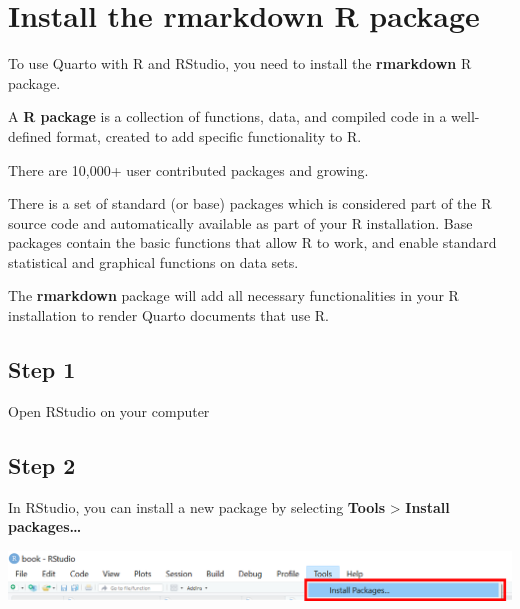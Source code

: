 \documentclass[
  letterpaper,
  DIV=11,
  numbers=noendperiod,
  oneside]{scrreprt}
\begin{document}
\hypertarget{sec-rmarkdown-installation}{%
\section{Install the rmarkdown R
package}\label{sec-rmarkdown-installation}}

To use Quarto with R and RStudio, you need to install the
\textbf{rmarkdown} R package.

\begin{tcolorbox}[enhanced jigsaw, coltitle=black, opacityback=0, title=\textcolor{quarto-callout-note-color}{\faInfo}\hspace{0.5em}{Note}, toprule=.15mm, bottomtitle=1mm, colbacktitle=quarto-callout-note-color!10!white, colframe=quarto-callout-note-color-frame, left=2mm, opacitybacktitle=0.6, bottomrule=.15mm, arc=.35mm, toptitle=1mm, colback=white, titlerule=0mm, breakable, leftrule=.75mm, rightrule=.15mm]

A \textbf{R package} is a collection of functions, data, and compiled
code in a well-defined format, created to add specific functionality to
R.

There are 10,000+ user contributed packages and growing.

There is a set of standard (or base) packages which is considered part
of the R source code and automatically available as part of your R
installation. Base packages contain the basic functions that allow R to
work, and enable standard statistical and graphical functions on data
sets.

\end{tcolorbox}

The \textbf{rmarkdown} package will add all necessary functionalities in
your R installation to render Quarto documents that use R.

\subsection{Step 1}

Open RStudio on your computer

\subsection{Step 2}

In RStudio, you can install a new package by selecting \textbf{Tools}
\textgreater{} \textbf{Install packages\ldots{}}

\includegraphics{images/paste-100922E2.png}
\end{document}
